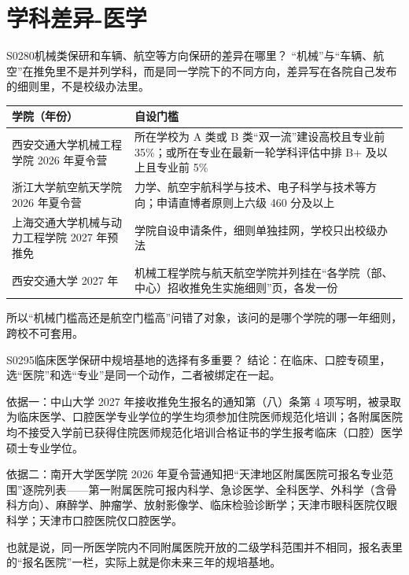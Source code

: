 \section{学科差异-医学}
\begin{qa}{S0280}{机械类保研和车辆、航空等方向保研的差异在哪里？}
“机械”与“车辆、航空”在推免里不是并列学科，而是同一学院下的不同方向，差异写在各院自己发布的细则里，不是校级办法里。

\par\vspace{2pt}\nobreak\begin{center}\footnotesize
\begin{tabularx}{\textwidth}{>{\raggedright\arraybackslash}X>{\raggedright\arraybackslash}X}
\toprule
\textbf{学院（年份）} & \textbf{自设门槛} \\ \midrule
西安交通大学机械工程学院 2026 年夏令营 & 所在学校为 A 类或 B 类“双一流”建设高校且专业前 35\%；或所在专业在最新一轮学科评估中排 B+ 及以上且专业前 5\% \\
浙江大学航空航天学院 2026 年夏令营 & 力学、航空宇航科学与技术、电子科学与技术等方向；申请直博者原则上六级 460 分及以上 \\
上海交通大学机械与动力工程学院 2027 年预推免 & 学院自设申请条件，细则单独挂网，学校只出校级办法 \\
西安交通大学 2027 年 & 机械工程学院与航天航空学院并列挂在“各学院（部、中心）招收推免生实施细则”页，各发一份 \\
\bottomrule
\end{tabularx}
\end{center}\vspace{2pt}\par

所以“机械门槛高还是航空门槛高”问错了对象，该问的是哪个学院的哪一年细则，跨校不可套用。
\end{qa}

\begin{qa}{S0295}{临床医学保研中规培基地的选择有多重要？}
结论：在临床、口腔专硕里，选“医院”和选“专业”是同一个动作，二者被绑定在一起。

依据一：中山大学 2027 年接收推免生报名的通知第（八）条第 4 项写明，被录取为临床医学、口腔医学专业学位的学生均须参加住院医师规范化培训；各附属医院均不接受入学前已获得住院医师规范化培训合格证书的学生报考临床（口腔）医学硕士专业学位。

依据二：南开大学医学院 2026 年夏令营通知把“天津地区附属医院可报名专业范围”逐院列表——第一附属医院可报内科学、急诊医学、全科医学、外科学（含骨科方向）、麻醉学、肿瘤学、放射影像学、临床检验诊断学；天津市眼科医院仅眼科学；天津市口腔医院仅口腔医学。

也就是说，同一所医学院内不同附属医院开放的二级学科范围并不相同，报名表里的“报名医院”一栏，实际上就是你未来三年的规培基地。
\end{qa}

